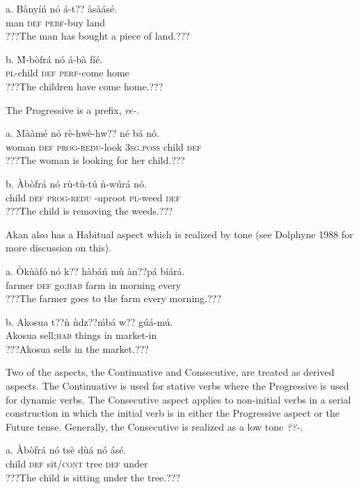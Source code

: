 \documentclass[output=paper]{langsci/langscibook}
\begin{document}
\ea
\gll \textup{a.}  Bànyíń nó  á-t??     àsàásé.\\
       man  \textsc{def}  \textsc{perf}{}-buy  land\\
\glt ???The man has bought a piece of land.???
\z

\ea
\gll \textup{b.  }\`{M}-bòfrá  nó  á-bà    fíé.\\
     \textsc{  pl}{}-child  \textsc{def}  \textsc{perf}{}-come  home\\
\glt ???The children have come home.???
\z

The Progressive is a prefix, \emph{re-}.

\ea
\gll \textup{a.  }Mààmé   nó  rè-hwè-hw??     né    bá   nó.\\
       woman    \textsc{def}  \textsc{prog-redu}{}-look  \textsc{3sg.poss}  child  \textsc{def}\\
\glt ???The woman is looking for her child.???
\z

\ea
\gll b.  \`{A}bòfrá  nó  r\`{u}-t\`{u}-tú    ǹ-wúrá    nó.\\
       child  \textsc{def}  \textsc{prog-redu} -uproot  \textsc{pl}{}-weed  \textsc{def}\\
\glt ???The child is removing the weeds.???
\z

Akan also has a Habitual aspect which is realized by tone (see Dolphyne 1988 for more discussion on this).

\ea
\gll a.  \`{O}k\`{u}àfó  nó   k??    hàbáń  m\`{u}  àn??pá    bíárá.\\
       farmer  \textsc{def}  go;\textsc{hab}    farm  in  morning  every\\
\glt ???The farmer goes to the farm every morning.???
\z

\ea
\gll b.  Akosua    t??ǹ     ǹdz??ḿbá  w??  gúá-mú.\\
       Akosua  sell;\textsc{hab}  things    in  market-in\\
\glt ???Akosua sells in the market.???
\z

Two of the aspects, the Continuative and Consecutive, are treated as derived aspects. The Continuative is used for stative verbs where the Progressive is used for dynamic verbs. The Consecutive aspect applies to non-initial verbs in a serial construction in which the initial verb is in either the Progressive aspect or the Future tense. Generally, the Consecutive is realized as a low tone \emph{??-}.

\ea
\gll a.  \`{A}bòfrá  nó  tsè    d\`{u}á  nó  ásé.\\
       child  \textsc{def}  sit/\textsc{cont}  tree  \textsc{def}  under\\
\glt ???The child is sitting under the tree.???
\z
\end{document}
